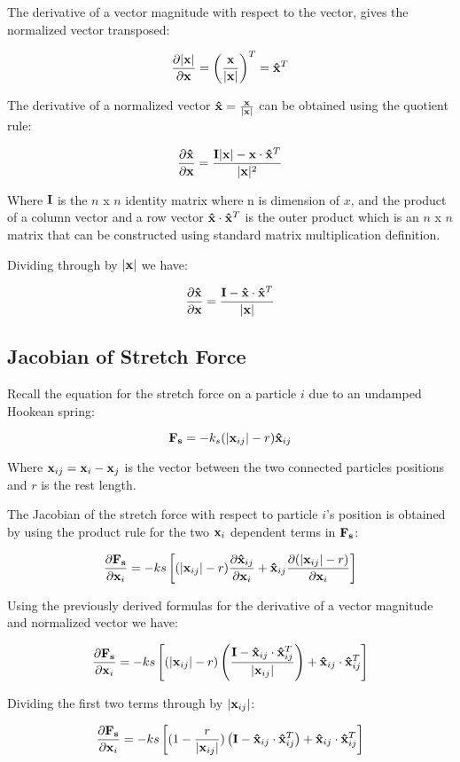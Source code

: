 \documentclass[11pt]{article}
\begin{document}
The derivative of a vector magnitude with respect to the vector, gives the normalized vector transposed: 

\[\frac{\partial|\mathbf{x}|}{\partial \mathbf{x} } = \left(\frac{\mathbf{x}}{|\mathbf{x}|}\right)^T = \mathbf{\hat{x}}^T \]


The derivative of a normalized vector $\mathbf{\hat{x}} = \frac{\mathbf{x}}{|\mathbf{x}|} $ can be obtained using the quotient rule:

\[\frac{\partial\mathbf{\hat{x}}}{\partial \mathbf{x} } = \frac{\mathbf{I}|\mathbf{x}| - \mathbf{x}\cdot\mathbf{\hat{x}}^T}{|\mathbf{x}|^2}\]

Where $\mathbf{I}$ is the $n$ x $n$ identity matrix where n is dimension of $x$, and the product of a column vector and a row vector $\mathbf{\hat{x}}\cdot\mathbf{\hat{x}}^T$ is the outer product which is an $n$ x $n$ matrix that can be constructed using standard matrix multiplication definition.

Dividing through by $|\mathbf{x}|$ we have:

\[\frac{\partial\mathbf{\hat{x}}}{\partial \mathbf{x} } = \frac{\mathbf{I} - \mathbf{\hat{x}}\cdot\mathbf{\hat{x}}^T}{\mathbf{|x|}}\]

\subsection{Jacobian of Stretch Force}

Recall the equation for the stretch force on a particle $i$ due to an undamped Hookean spring:

\[\mathbf{F_s} = -k_s(|\mathbf{x}_{ij}| - r)\mathbf{\hat{x}}_{ij}\]

Where $\mathbf{x}_{ij} = \mathbf{x}_i - \mathbf{x}_j$ is the vector between the two connected particles positions and $r$ is the rest length.

The Jacobian of the stretch force with respect to particle $i$'s position is obtained by using the product rule for the two $\mathbf{x}_i$ dependent terms in $\mathbf{F_s}$:

\[\frac{\partial\mathbf{F_s}}{\partial \mathbf{x}_i} = -ks\left[(|\mathbf{x}_{ij}| - r)\frac{\partial\mathbf{\hat{x}}_{ij}}{\partial \mathbf{x}_i} + \mathbf{\hat{x}}_{ij}\frac{\partial(|\mathbf{x}_{ij}| - r)}{\partial \mathbf{x}_i}\right]\]

Using the previously derived formulas for the derivative of a vector magnitude and normalized vector we have:

\[\frac{\partial\mathbf{F_s}}{\partial \mathbf{x}_i} = -ks\left[(|\mathbf{x}_{ij}| - r)\left(\frac{\mathbf{I} - \mathbf{\hat{x}}_{ij}\cdot \mathbf{\hat{x}}_{ij}^T}{|\mathbf{x}_{ij}|}\right) + \mathbf{\hat{x}}_{ij}\cdot \mathbf{\hat{x}}_{ij}^T\right]\]

Dividing the first two terms through by $|\mathbf{x}_{ij}|$:

\[\frac{\partial\mathbf{F_s}}{\partial \mathbf{x}_i} = -ks\left[(1 - \frac{r}{|\mathbf{x}_{ij}|})\left(\mathbf{I} - \mathbf{\hat{x}}_{ij}\cdot \mathbf{\hat{x}}_{ij}^T\right) + \mathbf{\hat{x}}_{ij}\cdot \mathbf{\hat{x}}_{ij}^T\right]\]
\end{document}
